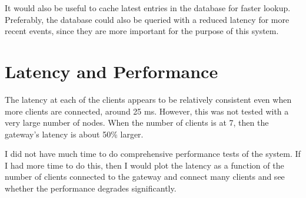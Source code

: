 \documentclass[]{article}
\begin{document}
It would also be useful to cache latest entries in the database for faster lookup. Preferably, the database could also be queried with a reduced latency for more recent events, since they are more important for the purpose of this system.

\section{Latency and Performance}

The latency at each of the clients appears to be relatively consistent even when more clients are connected, around 25 ms. However, this was not tested with a very large number of nodes. When the number of clients is at 7, then the gateway's latency is about 50\% larger.

I did not have much time to do comprehensive performance tests of the system. If I had more time to do this, then I would plot the latency as a function of the number of clients connected to the gateway and connect many clients and see whether the performance degrades significantly.
\end{document}
